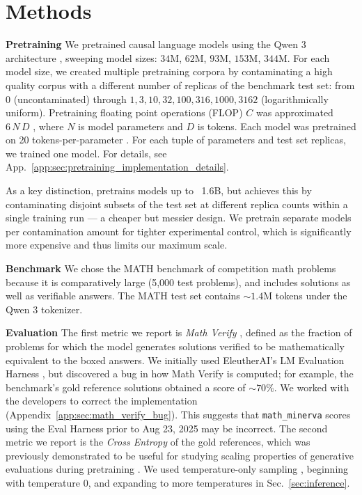 
\section{Methods}
\label{sec:methods}

\textbf{Pretraining} We pretrained causal language models \citep{vaswani2017attention, brown2020language} using the Qwen 3 architecture \citep{yang2025qwen3technicalreport}, sweeping model sizes: $34$M, $62$M, $93$M, $153$M, $344$M.
For each model size, we created multiple pretraining corpora by contaminating a high quality corpus \citep{penedo2024finewebdatasetsdecantingweb} with a different number of replicas of the benchmark test set: from $0$ (uncontaminated) through $1, 3, 10, 32, 100, 316, 1000, 3162$ (logarithmically uniform).
Pretraining floating point operations (FLOP) $C$ was approximated $ 6  \, N \, D$ \citep{kaplan2020scaling,sardana2024beyond,porian2024resolving,gadre2024languagemodelsscalereliably}, where $N$ is model parameters and $D$ is tokens.
Each model was pretrained on 20 tokens-per-parameter \citep{hoffman2022chinchilla}.
For each tuple of parameters and test set replicas, we trained one model.
For details, see App.~\ref{app:sec:pretraining_implementation_details}.

As a key distinction, \citet{bordt2025howmuch} pretrains models up to ~1.6B, but achieves this by contaminating disjoint subsets of the test set at different replica counts within a single training run --- a cheaper but messier design. We pretrain separate models per contamination amount for tighter experimental control, which is significantly more expensive and thus limits our maximum scale.

\textbf{Benchmark} We chose the MATH \citep{hendrycks2021measuringmathematicalproblemsolving} benchmark of competition math problems because it is comparatively large (5,000 test problems), and includes solutions as well as verifiable answers.
The MATH test set contains $\mathord{\sim}1.4$M tokens under the Qwen 3 tokenizer.

\textbf{Evaluation}
The first metric we report is \emph{Math Verify} \citep{kydlicek2025fixing}, defined as the fraction of problems for which the model generates solutions verified to be mathematically equivalent to the boxed answers.
We initially used EleutherAI's LM Evaluation Harness \citep{gao2024evalharness}, but discovered a bug in how Math Verify is computed; for example, the benchmark's gold reference solutions obtained a score of $\mathord{\sim}70\%$.
We worked with the developers to correct the implementation (Appendix~\ref{app:sec:math_verify_bug}).
This suggests that \texttt{math\_minerva} scores using the Eval Harness prior to Aug 23, 2025 may be incorrect.
The second metric we report is the \emph{Cross Entropy} of the gold references, which was previously demonstrated to be useful for studying scaling properties of generative evaluations during pretraining \citep{schaeffer2025pretrainingscalinglawsgenerative}.
We used temperature-only sampling \citep{schaeffer2025minpmaxexaggerationcritical}, beginning with temperature $0$, and expanding to more temperatures in Sec.~\ref{sec:inference}.
